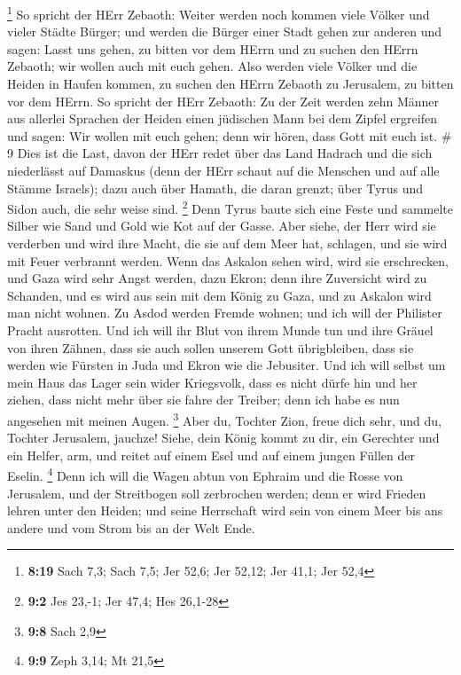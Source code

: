 \footnote{\textbf{8:19} Sach 7,3; Sach 7,5; Jer 52,6; Jer 52,12; Jer
  41,1; Jer 52,4}  So spricht der HErr Zebaoth: Weiter
werden noch kommen viele Völker und vieler Städte Bürger; 
und werden die Bürger einer Stadt gehen zur anderen und sagen: Lasst uns
gehen, zu bitten vor dem HErrn und zu suchen den HErrn Zebaoth; wir
wollen auch mit euch gehen.  Also werden viele Völker und
die Heiden in Haufen kommen, zu suchen den HErrn Zebaoth zu Jerusalem,
zu bitten vor dem HErrn.  So spricht der HErr Zebaoth: Zu
der Zeit werden zehn Männer aus allerlei Sprachen der Heiden einen
jüdischen Mann bei dem Zipfel ergreifen und sagen: Wir wollen mit euch
gehen; denn wir hören, dass Gott mit euch ist. \# 9  Dies
ist die Last, davon der HErr redet über das Land Hadrach und die sich
niederlässt auf Damaskus (denn der HErr schaut auf die Menschen und auf
alle Stämme Israels);  dazu auch über Hamath, die daran
grenzt; über Tyrus und Sidon auch, die sehr weise sind. \footnote{\textbf{9:2}
  Jes 23,-1; Jer 47,4; Hes 26,1-28}  Denn Tyrus baute sich
eine Feste und sammelte Silber wie Sand und Gold wie Kot auf der Gasse.
 Aber siehe, der Herr wird sie verderben und wird ihre
Macht, die sie auf dem Meer hat, schlagen, und sie wird mit Feuer
verbrannt werden.  Wenn das Askalon sehen wird, wird sie
erschrecken, und Gaza wird sehr Angst werden, dazu Ekron; denn ihre
Zuversicht wird zu Schanden, und es wird aus sein mit dem König zu Gaza,
und zu Askalon wird man nicht wohnen.  Zu Asdod werden
Fremde wohnen; und ich will der Philister Pracht ausrotten. 
Und ich will ihr Blut von ihrem Munde tun und ihre Gräuel von ihren
Zähnen, dass sie auch sollen unserem Gott übrigbleiben, dass sie werden
wie Fürsten in Juda und Ekron wie die Jebusiter.  Und ich
will selbst um mein Haus das Lager sein wider Kriegsvolk, dass es nicht
dürfe hin und her ziehen, dass nicht mehr über sie fahre der Treiber;
denn ich habe es nun angesehen mit meinen Augen. \footnote{\textbf{9:8}
  Sach 2,9}  Aber du, Tochter Zion, freue dich sehr, und du,
Tochter Jerusalem, jauchze! Siehe, dein König kommt zu dir, ein
Gerechter und ein Helfer, arm, und reitet auf einem Esel und auf einem
jungen Füllen der Eselin. \footnote{\textbf{9:9} Zeph 3,14; Mt 21,5}
 Denn ich will die Wagen abtun von Ephraim und die Rosse
von Jerusalem, und der Streitbogen soll zerbrochen werden; denn er wird
Frieden lehren unter den Heiden; und seine Herrschaft wird sein von
einem Meer bis ans andere und vom Strom bis an der Welt Ende.
